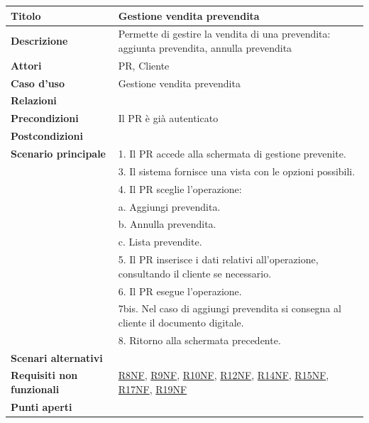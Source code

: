 \documentclass[a4paper]{article}
\begin{document}
\begin{center}
\begin{tabularx}{1\textwidth}{|l|X|}
    \hline
	\textbf{Titolo} & Gestione vendita prevendita \\
	\hline
	\textbf{Descrizione} & Permette di gestire la vendita di una prevendita: aggiunta prevendita, annulla prevendita \\
	\hline
	\textbf{Attori} & PR, Cliente \\
	\hline
	\textbf{Caso d'uso} & Gestione vendita prevendita \\
	\hline
	\textbf{Relazioni} &  \\
	\hline
	\textbf{Precondizioni} & Il PR è già autenticato \\
	\hline
	\textbf{Postcondizioni} &  \\
	\hline
	\textbf{Scenario principale} & 1. Il PR accede alla schermata di gestione prevenite. \\
								 & 3. Il sistema fornisce una vista con le opzioni possibili. \\
								 & 4. Il PR sceglie l'operazione:\\
								 & \quad a. Aggiungi prevendita.\\
								 & \quad b. Annulla prevendita.\\
								 & \quad c. Lista prevendite.\\
								 & 5. Il PR inserisce i dati relativi all'operazione, consultando il cliente se necessario.\\
								 & 6. Il PR esegue l'operazione.\\
								 & 7bis. Nel caso di aggiungi prevendita si consegna al cliente il documento digitale.\\
								 & 8. Ritorno alla schermata precedente.\\
	\hline
	\textbf{Scenari alternativi} & \\
	\hline
	\textbf{Requisiti non funzionali} & \hyperlink{R8NF}{R8NF}, \hyperlink{R9NF}{R9NF}, \hyperlink{R10NF}{R10NF}, \hyperlink{R12NF}{R12NF}, \hyperlink{R14NF}{R14NF}, \hyperlink{R15NF}{R15NF}, \hyperlink{R17NF}{R17NF}, \hyperlink{R19NF}{R19NF}  \\
	\hline
	\textbf{Punti aperti} & \\
	\hline
\end{tabularx}
\end{center}

\end{document}
